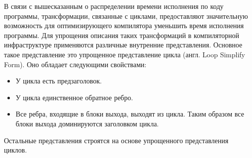 В связи с вышесказанным о распределении времени исполнения по коду программы, трансформации, связанные с циклами, предоставляют значительную возможность для оптимизирующего компилятора уменьшить время исполнения программы.
Для упрощения описания таких трансформаций в компиляторной инфраструктуре применяются различные внутренние представления. Основное такое представление это упрощенное представление цикла (англ. Loop Simplify Form). Оно обладает следующими свойствами:
\begin{itemize}
    \item У цикла есть предзаголовок.
    \item У цикла единственное обратное ребро.
    \item Все ребра, входящие в блоки выхода, выходят из цикла. Таким образом все блоки выхода доминируются заголовком цикла.
\end{itemize}
Остальные представления строятся на основе упрощенного представления циклов.
\newpage

